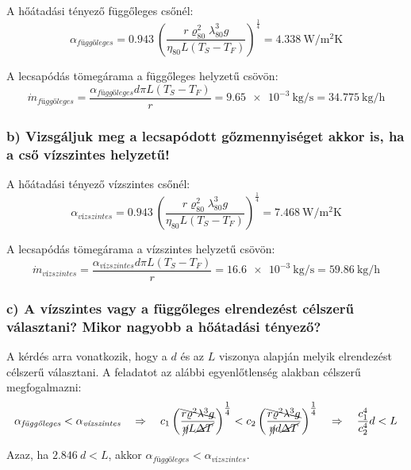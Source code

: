 A hőátadási tényező függőleges csőnél:
\vspace{-2mm}
\begin{equation}
	\alpha_{\textit{függőleges}} = \SI{0.943}{} \left(\dfrac{r \varrho_{80}^2 \lambda_{80}^3 g}{\eta_{80} L \left(T_S - T_F\right)}\right)^{\tfrac{1}{4}} = \SI{4.338}{\watt\per\meter\squared\kelvin}
\end{equation}

A lecsapódás tömegárama a függőleges helyzetű csövön:
\begin{equation}
	\dot{m}_{\textit{függőleges}} = \dfrac{\alpha_{\textit{függőleges}} d \pi L \left(T_S - T_F\right)}{r} = \SI{9.65e-3}{\kilogram\per\second} = \SI{34.775}{\kilogram\per\hour}
\end{equation}


\subsubsection*{b) Vizsgáljuk meg a lecsapódott gőzmennyiséget akkor is, ha a cső vízszintes helyzetű!}
A hőátadási tényező vízszintes csőnél:
\vspace{-2mm}
\begin{equation}
	\alpha_{\textit{vízszintes}} = \SI{0.943}{} \left(\dfrac{r \varrho_{80}^2 \lambda_{80}^3 g}{\eta_{80} L \left(T_S - T_F\right)}\right)^{\tfrac{1}{4}} = \SI{7.468}{\watt\per\meter\squared\kelvin}
\end{equation}

A lecsapódás tömegárama a vízszintes helyzetű csövön:
\begin{equation}
	\dot{m}_{\textit{vízszintes}} = \dfrac{\alpha_{\textit{vízszintes}} d \pi L \left(T_S - T_F\right)}{r} = \SI{16.6e-3}{\kilogram\per\second} = \SI{59.86}{\kilogram\per\hour}
\end{equation}

\subsubsection*{c) A vízszintes vagy a függőleges elrendezést célszerű választani? Mikor nagyobb a hőátadási tényező?}
A kérdés arra vonatkozik, hogy a $d$ és az $L$ viszonya alapján melyik elrendezést célszerű választani. A feladatot az alábbi egyenlőtlenség alakban célszerű megfogalmazni:
\begin{equation}
	\alpha_{\textit{függőleges}} < \alpha_{\textit{vízszintes}} 
	\quad \Rightarrow \quad 
	c_1 \left(\dfrac{\bcancel{r \varrho^2 \lambda^3 g}}{\cancel{\eta} L \cancel{\Delta T}}\right)^{\tfrac{1}{4}} 
	< 
	c_2 \left(\dfrac{\bcancel{r \varrho^2 \lambda^3 g}}{\cancel{\eta} d \cancel{\Delta T}}\right)^{\tfrac{1}{4}} 
	\quad \Rightarrow \quad 
	\dfrac{c_1^4}{c_2^4} d < L
\end{equation}

Azaz, ha $\SI{2.846}{} d < L$, akkor $\alpha_{\textit{függőleges}} < \alpha_{\textit{vízszintes}}$.

\pagebreak